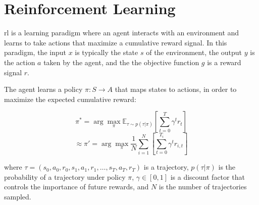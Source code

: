 \section{Reinforcement Learning}
\label{section:rl}

 \ac{rl} is a learning paradigm where an agent interacts with an environment and learns to take actions that maximize a 
cumulative reward signal. In this paradigm, the input $x$ is typically the state $s$ of the environment, the output $y$ is the action $a$ taken by the agent, 
and the the objective function $g$ is a reward signal $r$.

The agent learns a policy $\pi: S \to A$ that maps states to actions, in order to maximize the expected cumulative reward:

\begin{equation*}
    \label{rl_objective}
    \pi^* = \arg\max_{\pi} \mathbb{E}_{\tau \sim p(\tau | \pi)} \left[ \sum_{t=0}^T \gamma^t r_t \right]   
\end{equation*}
\begin{equation}
    \approx \pi' = \arg\max_{\pi} \frac{1}{N} \sum_{i=1}^N \left[ \sum_{t=0}^{T_i} \gamma^t r_{i,t} \right]
\end{equation}

where $\tau = (s_0, a_0, r_0, s_1, a_1, r_1, \ldots, s_T, a_T, r_T)$ is a trajectory, $p(\tau | \pi)$ is the probability of a trajectory 
under policy $\pi$, $\gamma \in [0,1]$ is a discount factor that controls the importance of future rewards, and $N$ is the number of trajectories sampled.

